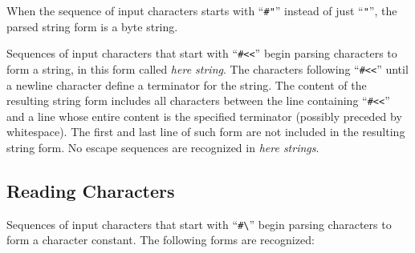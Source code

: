 When the sequence of input characters starts with ``\lstinline!#"!'' instead of just ``\lstinline!"!'', the parsed string form is a byte string. %

Sequences of input characters that start with ``\lstinline!#<<!'' begin parsing characters to form a string, in this form called {\em here string}. The characters following ``\lstinline!#<<!'' until a newline character define a terminator for the string. The content of the resulting string form includes all characters between the line containing ``\lstinline!#<<!'' and a line whose entire content is the specified terminator (possibly preceded by whitespace). The first and last line of such form are not included in the resulting string form. No escape sequences are recognized in {\em here strings}. %





\subsection{Reading Characters}
\label{subsec:aml-base-lang-reader-characters}

Sequences of input characters that start with ``\lstinline!#\!'' begin parsing characters to form a character constant. The following forms are recognized:

